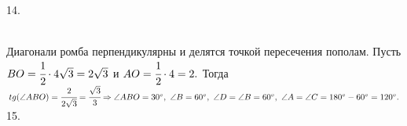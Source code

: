 \documentclass[12pt]{article}
\begin{document}
14. \begin{figure}[ht!]
\end{figure}\\
Диагонали ромба перпендикулярны и делятся точкой пересечения пополам. Пусть $BO=\cfrac{1}{2}\cdot4\sqrt{3}=2\sqrt{3}$ и $AO=\cfrac{1}{2}\cdot4=2.$ Тогда $tg(\angle ABO)=\cfrac{2}{2\sqrt{3}}=\cfrac{\sqrt{3}}{3}\Rightarrow \angle ABO =30^\circ,\ \angle B=60^\circ,\ \angle D=\angle B=60^\circ,\ \angle A=\angle C=180^\circ-60^\circ=120^\circ.$\\
15. \begin{figure}[ht!]
\end{figure}\\
\end{document}
